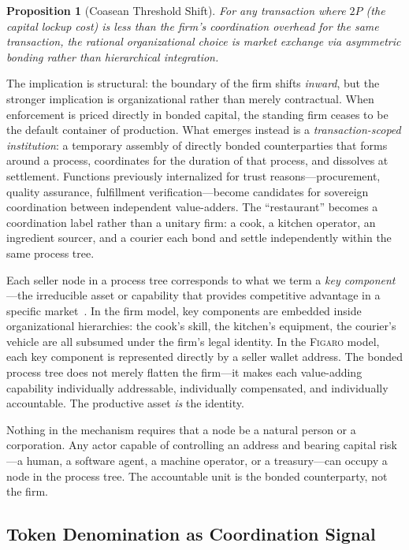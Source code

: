 \documentclass[11pt,a4paper]{article}
\newtheorem{proposition}[theorem]{Proposition}
\theoremstyle{definition}
\theoremstyle{remark}
\newcommand{\figaro}{\textsc{Figaro}}
\newcommand{\pay}{P}           %
\begin{document}
\begin{proposition}[Coasean Threshold Shift]
\label{prop:coasean-shift}
For any transaction where $2\pay$ (the capital lockup cost) is less than
the firm's coordination overhead for the same transaction, the rational
organizational choice is market exchange via asymmetric bonding rather
than hierarchical integration.
\end{proposition}

The implication is structural: the boundary of the firm shifts
\emph{inward}, but the stronger implication is organizational rather
than merely contractual. When enforcement is priced directly in bonded
capital, the standing firm ceases to be the default container of
production. What emerges instead is a \emph{transaction-scoped
institution}: a temporary assembly of directly bonded counterparties
that forms around a process, coordinates for the duration of that
process, and dissolves at settlement. Functions previously internalized
for trust reasons---procurement, quality assurance, fulfillment
verification---become candidates for sovereign coordination between
independent value-adders. The ``restaurant'' becomes a coordination
label rather than a unitary firm: a cook, a kitchen operator, an
ingredient sourcer, and a courier each bond and settle independently
within the same process tree.

Each seller node in a process tree corresponds to what we term a
\emph{key component}---the irreducible asset or capability that
provides competitive advantage in a specific
market~\citep{daliana2013}. In the firm model, key components are
embedded inside organizational hierarchies: the cook's skill, the
kitchen's equipment, the courier's vehicle are all subsumed under the
firm's legal identity. In the \figaro{} model, each key component is
represented directly by a seller wallet address. The bonded process
tree does not merely flatten the firm---it makes each value-adding
capability individually addressable, individually compensated, and
individually accountable. The productive asset \emph{is} the identity.

Nothing in the mechanism requires that a node be a natural person or a
corporation. Any actor capable of controlling an address and bearing
capital risk---a human, a software agent, a machine operator, or a
treasury---can occupy a node in the process tree. The accountable unit
is the bonded counterparty, not the firm.

\subsection{Token Denomination as Coordination Signal}
\end{document}

